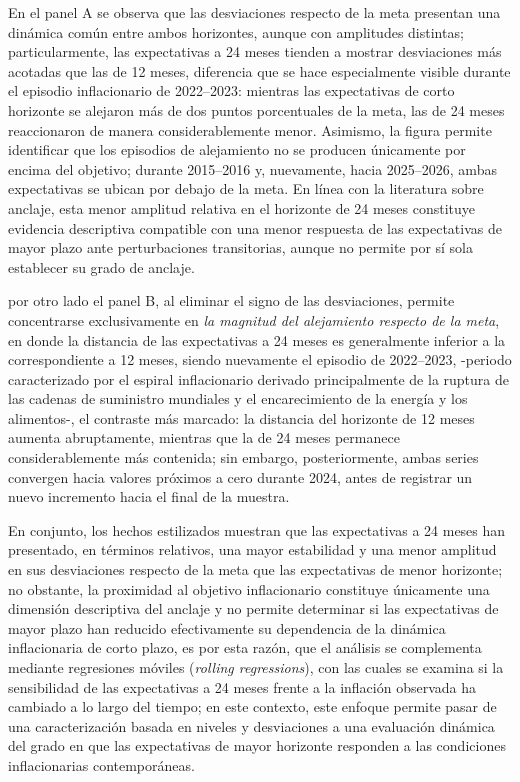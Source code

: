 \documentclass[
  10.5pt,
  letterpaper,
  twocolumn]{article}
\begin{document}
En el panel A se observa que las desviaciones respecto de la meta
presentan una dinámica común entre ambos horizontes, aunque con
amplitudes distintas; particularmente, las expectativas a 24 meses
tienden a mostrar desviaciones más acotadas que las de 12 meses,
diferencia que se hace especialmente visible durante el episodio
inflacionario de 2022--2023: mientras las expectativas de corto
horizonte se alejaron más de dos puntos porcentuales de la meta, las de
24 meses reaccionaron de manera considerablemente menor. Asimismo, la
figura permite identificar que los episodios de alejamiento no se
producen únicamente por encima del objetivo; durante 2015--2016 y,
nuevamente, hacia 2025--2026, ambas expectativas se ubican por debajo de
la meta. En línea con la literatura sobre anclaje, esta menor amplitud
relativa en el horizonte de 24 meses constituye evidencia descriptiva
compatible con una menor respuesta de las expectativas de mayor plazo
ante perturbaciones transitorias, aunque no permite por sí sola
establecer su grado de anclaje.

por otro lado el panel B, al eliminar el signo de las desviaciones,
permite concentrarse exclusivamente en \emph{la magnitud del alejamiento
respecto de la meta}, en donde la distancia de las expectativas a 24
meses es generalmente inferior a la correspondiente a 12 meses, siendo
nuevamente el episodio de 2022--2023, -periodo caracterizado por el
espiral inflacionario derivado principalmente de la ruptura de las
cadenas de suministro mundiales y el encarecimiento de la energía y los
alimentos-, el contraste más marcado: la distancia del horizonte de 12
meses aumenta abruptamente, mientras que la de 24 meses permanece
considerablemente más contenida; sin embargo, posteriormente, ambas
series convergen hacia valores próximos a cero durante 2024, antes de
registrar un nuevo incremento hacia el final de la muestra.

En conjunto, los hechos estilizados muestran que las expectativas a 24
meses han presentado, en términos relativos, una mayor estabilidad y una
menor amplitud en sus desviaciones respecto de la meta que las
expectativas de menor horizonte; no obstante, la proximidad al objetivo
inflacionario constituye únicamente una dimensión descriptiva del
anclaje y no permite determinar si las expectativas de mayor plazo han
reducido efectivamente su dependencia de la dinámica inflacionaria de
corto plazo, es por esta razón, que el análisis se complementa mediante
regresiones móviles (\emph{rolling regressions}), con las cuales se
examina si la sensibilidad de las expectativas a 24 meses frente a la
inflación observada ha cambiado a lo largo del tiempo; en este contexto,
este enfoque permite pasar de una caracterización basada en niveles y
desviaciones a una evaluación dinámica del grado en que las expectativas
de mayor horizonte responden a las condiciones inflacionarias
contemporáneas.
\end{document}
